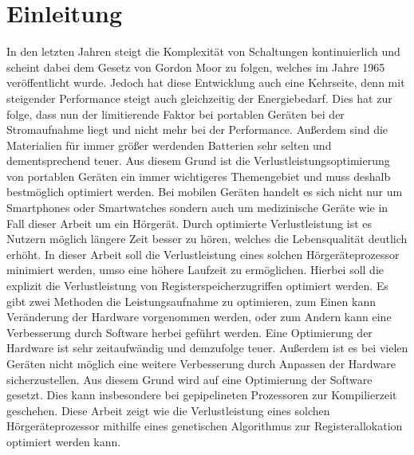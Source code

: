 
\thispagestyle{empty}
%
\chapter{Einleitung}
\label{chap:introduction}
In den letzten Jahren steigt die Komplexität von Schaltungen kontinuierlich und scheint dabei dem Gesetz von Gordon Moor zu folgen, welches im Jahre 1965 veröffentlicht wurde. Jedoch hat diese Entwicklung auch eine Kehrseite, denn mit steigender Performance steigt auch gleichzeitig der Energiebedarf. Dies hat zur folge, dass nun der limitierende Faktor bei portablen Geräten bei der Stromaufnahme liegt und nicht mehr bei der Performance. Außerdem sind die Materialien für immer größer werdenden Batterien sehr selten und dementsprechend teuer. Aus diesem Grund ist die Verlustleistungsoptimierung von portablen Geräten ein immer wichtigeres Themengebiet und muss deshalb bestmöglich optimiert werden. Bei mobilen Geräten handelt es sich nicht nur um Smartphones oder Smartwatches sondern auch um medizinische Geräte wie in Fall dieser Arbeit um ein Hörgerät. Durch optimierte Verlustleistung ist es Nutzern möglich längere Zeit besser zu hören, welches die Lebensqualität deutlich erhöht.
In dieser Arbeit soll die Verlustleistung eines solchen Hörgeräteprozessor minimiert werden, umso eine höhere Laufzeit zu ermöglichen. Hierbei soll die explizit die Verlustleistung von Registerspeicherzugriffen optimiert werden. 
Es gibt zwei Methoden die Leistungsaufnahme zu optimieren, zum Einen kann Veränderung der Hardware vorgenommen werden, oder zum Andern kann eine Verbesserung durch Software herbei geführt werden. Eine Optimierung der Hardware ist sehr zeitaufwändig und demzufolge teuer. Außerdem ist es bei vielen Geräten nicht möglich eine weitere Verbesserung durch Anpassen der Hardware sicherzustellen. Aus diesem Grund wird auf eine Optimierung der Software gesetzt. Dies kann insbesondere bei gepipelineten Prozessoren zur Kompilierzeit geschehen. 
Diese Arbeit zeigt wie die Verlustleistung eines solchen Hörgeräteprozessor mithilfe eines genetischen Algorithmus zur Registerallokation optimiert werden kann.

